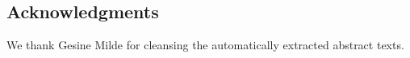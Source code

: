 \documentclass[10pt,journal,compsoc]{IEEEtran}
\begin{document}


\subsection{Acknowledgments}
\noindent We thank Gesine Milde for cleansing the automatically extracted abstract texts.




\end{document}
